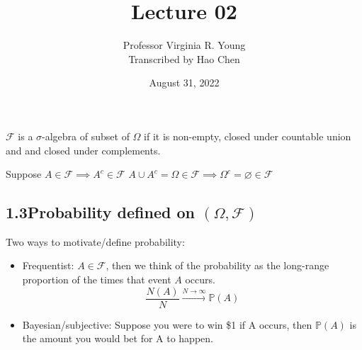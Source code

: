 \documentclass[a4paper]{article}
\title{Lecture 02}
\author{Professor Virginia R. Young\\ \small{Transcribed by Hao Chen}}
\date{August 31, 2022}
\newcommand{\F}{\mathcal F}
\newcommand{\Prob}{\mathbb{P}}
\renewcommand{\P}{\Prob}
\begin{document}
\maketitle

$\F$ is a $\sigma$-algebra of subset of $\Omega$ if it is non-empty, closed under countable union and and closed under complements.

Suppose $A\in\F \implies A^c\in\F$ $A\cup A^c=\Omega\in\F\implies\Omega^c=\varnothing\in\F$

\subsection*{1.3\;\;Probability defined on $(\Omega, \F)$}

Two ways to motivate/define probability:
\begin{itemize}
    \item Frequentist: $A\in\F$, then we think of the probability as the long-range proportion of the times that event $A$ occurs. \[\frac{N(A)}{N}\xrightarrow{N\rightarrow\infty}\P(A)\]
    \item Bayesian/subjective: Suppose you were to win \$1 if A occurs, then $\P(A)$ is the amount you would bet for A to happen.
\end{itemize}
\end{document}
